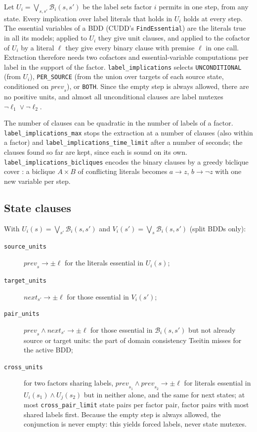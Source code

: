 \documentclass[manuscript, screen]{jair}
\newcommand{\opt}[1]{\texttt{#1}}
\newcommand{\B}{\mathcal{B}}
\newcommand{\prev}[1]{\mathit{prev}_{#1}}
\newcommand{\nxt}[1]{\mathit{next}_{#1}}
\begin{document}
Let $U_i = \bigvee_{s,s'} \B_i(s,s')$ be the label sets factor $i$ permits in one step, from any
state. Every implication over label literals that holds in $U_i$ holds at every step. The essential
variables of a BDD (CUDD's \texttt{FindEssential}) are the literals true in all its models; applied
to $U_i$ they give unit clauses, and applied to the cofactor of $U_i$ by a literal $\ell$ they give
every binary clause with premise $\ell$ in one call. Extraction therefore needs two cofactors and
essential-variable computations per label in the support of the factor.
\opt{label\_implications} selects \opt{UNCONDITIONAL} (from $U_i$), \opt{PER\_SOURCE} (from the union
over targets of each source state, conditioned on $\prev{s}$), or \opt{BOTH}. Since the empty step is
always allowed, there are no positive units, and almost all unconditional clauses are label mutexes
$\neg\ell_1 \vee \neg\ell_2$.

The number of clauses can be quadratic in the number of labels of a factor. \opt{label\_implications\_max}
stops the extraction at a number of clauses (also within a factor) and
\opt{label\_implications\_time\_limit} after a number of seconds; the clauses found so far are kept,
since each is sound on its own. \opt{label\_implications\_bicliques} encodes the binary clauses by a
greedy biclique cover \parencite{rintanen-ecai2006}: a biclique $A \times B$ of conflicting literals
becomes $a \rightarrow z$, $b \rightarrow \neg z$ with one new variable per step.

\subsection{State clauses}

With $U_i(s) = \bigvee_{s'} \B_i(s,s')$ and $V_i(s') = \bigvee_{s} \B_i(s,s')$ (split BDDs only):
\begin{description}
  \item[\opt{source\_units}] $\prev{s} \rightarrow \pm\ell$ for the literals essential in $U_i(s)$;
  \item[\opt{target\_units}] $\nxt{s'} \rightarrow \pm\ell$ for those essential in $V_i(s')$;
  \item[\opt{pair\_units}] $\prev{s} \wedge \nxt{s'} \rightarrow \pm\ell$ for those essential in
        $\B_i(s,s')$ but not already source or target units: the part of domain consistency Tseitin
        misses for the active BDD;
  \item[\opt{cross\_units}] for two factors sharing labels, $\prev{s_1} \wedge \prev{s_2} \rightarrow
        \pm\ell$ for literals essential in $U_{i}(s_1) \wedge U_{j}(s_2)$ but in neither alone, and the
        same for next states; at most \opt{cross\_pair\_limit} state pairs per factor pair, factor
        pairs with most shared labels first. Because the empty step is always allowed, the
        conjunction is never empty: this yields forced labels, never state mutexes.
\end{description}
\end{document}
